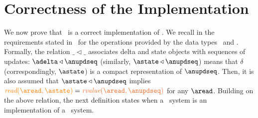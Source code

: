 
\section{Correctness of the Implementation}
\label{sec:simulation}

We now prove that  \igsp\ is a correct implementation 
of \gsp. We recall in  the requirements stated in~\cite{DBLP:conf/ecoop/BurckhardtLPF15}
for the operations provided by the data types 
\statetype\ and \deltatype. 
Formally,  the relation $\_\triangleleft \_$ associates 
 delta and state objects with sequences of updates: $\adelta\triangleleft\anupdseq$
 (similarly, $\astate\triangleleft\anupdseq$)  means  that $\delta$ (correspondingly, $\astate$) 
 is a compact representation of $\anupdseq$. Then, it is also assumed that 
$\astate\triangleleft\anupdseq$ implies  $\iread \aread \astate  = \rvalue \aread  \anupdseq$ for any $\aread$.
Building on the above relation, the next definition states when a
\igsp\ system is an implementation of a \gsp\ system.

